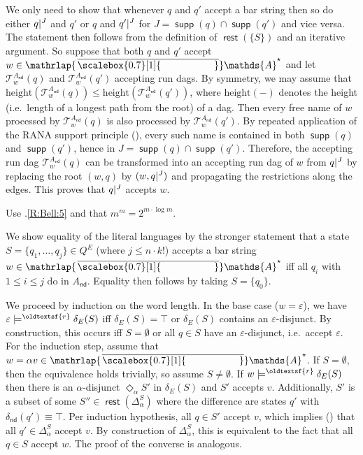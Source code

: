 \documentclass[10pt,a4paper]{amsart}
\theoremstyle{definition}
\renewcommand{\textsf}[1]{{\oldtextsf{\small#1}}}
\newcommand\restr[2]{{%
  \left.\kern-\nulldelimiterspace %
  #1 %
  \littletaller %
  \right|{}^{#2} %
}}
\newcommand{\littletaller}{\mathchoice{\vphantom{\big|}}{}{}{}}
\newcommand{\At}{\mathds{A}}
\newcommand{\barAs}{\barNames^{\star}}
\newcommand{\op}[1]{\operatorname{\mathsf{#1}}}
\newcommand{\nd}{\op{nd}}
\newcommand{\rest}{\op{rest}}
\newcommand{\runtree}[3]{\mathcal{T}_{#1}^{#2}(#3)}
\newcommand{\rsem}{\vDash^{\textsf{r}}}
\DeclareMathOperator{\supp}{\mathsf{supp}}
\newcommand{\names}{\At}
\newcommand{\set}[1]{\{#1\}}
\newcommand{\mybar}[3]{%
  \mathrlap{\hspace{#2}\overline{\scalebox{#1}[1]{\phantom{\ensuremath{#3}}}}}\ensuremath{#3}
}
\newcommand{\barNames}{{\mybar{0.7}{1.25pt}{\names}}}
\renewcommand{\vDash}{\models}
\let\originalleft\left
\let\originalright\right
\renewcommand{\left}{\mathopen{}\mathclose\bgroup\originalleft}
\renewcommand{\right}{\aftergroup\egroup\originalright}
\begin{document}
\begin{IEEEproof}
  We only need to show that whenever $q$ and $q'$ accept a bar string then so
  do either $\restr{q}{J}$ and $q'$ or $q$ and $\restr{q'}{J}$ for $J = \supp(q) \cap \supp(q')$
  and vice versa. The statement then follows from the definition of $\rest(\{S\})$
  and an iterative argument. So suppose that both $q$ and $q'$ accept $w \in \barAs$ and let $\runtree{w}{A_{\nd}}{q}$ and $\runtree{w}{A_{\nd}}{q'}$ accepting run dags. By symmetry, we may assume that $\mathrm{height}(\runtree{w}{A_{\nd}}{q})\leqslant \mathrm{height}(\runtree{w}{A_{\nd}}{q'})$, where $\mathrm{height}(-)$ denotes the height (i.e.~length of a longest path from the root) of a dag. Then every free name of $w$ processed by $\runtree{w}{A_{\nd}}{q}$ is also processed by $\runtree{w}{A_{\nd}}{q'}$. By repeated application of the RANA support principle (), every such name is contained in both $\supp(q)$ and $\supp(q')$, hence in $J=\supp(q)\cap \supp(q')$. Therefore, the accepting run dag $\runtree{w}{A_{\nd}}{q}$ can be transformed into an accepting run dag of $w$ from $\restr{q}{J}$ by replacing the root $(w,q)$ by $(w,\restr{q}{J})$ and propagating the restrictions along the edges. This proves that $\restr{q}{J}$ accepts $w$. 
\end{IEEEproof}



\begin{IEEEproof}
Use .\ref{R:Bell:5} and that $m^m = 2^{m \cdot \log m}$.
\end{IEEEproof}

\begin{IEEEproof}
We show equality of the literal languages by the stronger statement that a state
$S = \set{q_1, \dots, q_j} \in Q^E$ (where $j \leqslant n \cdot k!$) accepts a bar string $w \in \barAs$
iff all $q_i$ with $1 \leqslant i \leqslant j$ do in $A_{\nd}$. Equality then follows by taking $S=\{q_0\}$.

We proceed by induction on the word length. In the base case
($w = \varepsilon$), we have $\varepsilon \rsem \delta_E(S)$ iff $\delta_E(S)=\top$ or $\delta_E(S)$ contains an $\varepsilon$-disjunct. By
construction, this occurs iff $S = \emptyset$ or all $q \in S$ have an $\varepsilon$-disjunct, i.e.~accept
$\varepsilon$. For the induction step, assume that $w = \alpha v \in \barAs$. If $S = \emptyset$, then the equivalence holds trivially,
so assume $S\neq \emptyset$.
If $w \rsem \delta_E(S)$ then there is an $\alpha$-disjunct $\Diamond_{\alpha} S'$
in $\delta_E(S)$ and $S'$ accepts $v$. Additionally, $S'$ is a subset of some $S'' \in \rest(\Delta_{\alpha}^S)$
where the difference are states $q'$ with $\delta_{\nd}(q') \equiv \top$. Per induction hypothesis, all $q \in S'$
accept $v$, which implies () that all $q' \in \Delta_{\alpha}^S$ accept $v$.
By construction of $\Delta_{\alpha}^S$, this is equivalent to the fact that all $q \in S$ accept $w$. The proof of the converse is analogous.    
\end{IEEEproof}
\end{document}
